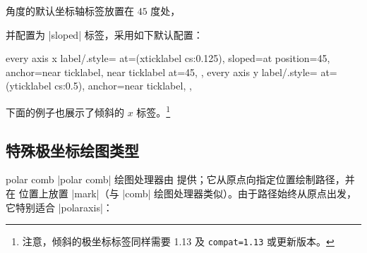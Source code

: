 {角度的默认坐标轴标签放置在 $45$ 度处，
%
\begin{codeexample}[]
\end{codeexample}
%
并配置为 |sloped| 标签，采用如下默认配置：
%
\begin{codeexample}
    every axis x label/.style={
        at={(xticklabel cs:0.125)},
        sloped={at position=45},
        anchor=near ticklabel,
        near ticklabel at=45,
    },
    every axis y label/.style={
        at={(yticklabel cs:0.5)},
        anchor=near ticklabel,
    },
\end{codeexample}

下面的例子也展示了倾斜的 $x$ 标签。\footnote{注意，倾斜的极坐标标签同样需要
\PGFPlots{} 1.13 及 \texttt{compat=1.13} 或更新版本。}
%
\begin{codeexample}[]
\end{codeexample}


\subsection{特殊极坐标绘图类型}

\begin{plottype}{polar comb}
    |polar comb| 绘图处理器由 \Tikz{} 提供；它从原点向指定位置绘制路径，并在
    位置上放置 |mark|（与 |comb| 绘图处理器类似）。由于路径始终从原点出发，
    它特别适合 |polaraxis|：
\begin{codeexample}[]
\end{codeexample}
\end{plottype}


}
